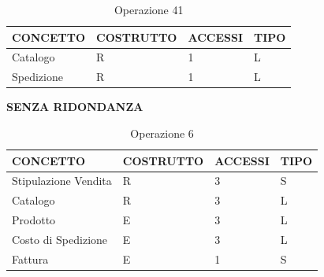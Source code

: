 \begin{table}[H]
\centering
\caption{Operazione 41}
\begin{tabular}{llll}
\\ \hline
\multicolumn{1}{|l|}{\textbf{CONCETTO}} & \multicolumn{1}{l|}{\textbf{COSTRUTTO}} & \multicolumn{1}{l|}{\textbf{ACCESSI}} & \multicolumn{1}{l|}{\textbf{TIPO}} \\ \hline
\multicolumn{1}{|l|}{Catalogo}
& \multicolumn{1}{l|}{R}                  & \multicolumn{1}{l|}{1}                & \multicolumn{1}{l|}{L}             \\ \hline
\multicolumn{1}{|l|}{Spedizione}
& \multicolumn{1}{l|}{R}                  & \multicolumn{1}{l|}{1}                & \multicolumn{1}{l|}{L}             \\ \hline
\end{tabular}
\end{table}


\centerline{\textbf{SENZA RIDONDANZA}}

\begin{table}[H]
\centering
\caption{Operazione 6}
\begin{tabular}{llll}
\\ \hline
\multicolumn{1}{|l|}{\textbf{CONCETTO}} & \multicolumn{1}{l|}{\textbf{COSTRUTTO}} & \multicolumn{1}{l|}{\textbf{ACCESSI}} & \multicolumn{1}{l|}{\textbf{TIPO}} \\ \hline
\multicolumn{1}{|l|}{Stipulazione Vendita}
& \multicolumn{1}{l|}{R}                  & \multicolumn{1}{l|}{3}                & \multicolumn{1}{l|}{S}             \\ \hline
\multicolumn{1}{|l|}{Catalogo}             & \multicolumn{1}{l|}{R}                  & \multicolumn{1}{l|}{3}        
& \multicolumn{1}{l|}{L}             
			 \\ \hline
\multicolumn{1}{|l|}{Prodotto}             & \multicolumn{1}{l|}{E}                  & \multicolumn{1}{l|}{3}        
& \multicolumn{1}{l|}{L}             
			 \\ \hline
\multicolumn{1}{|l|}{Costo di Spedizione}     & \multicolumn{1}{l|}{E}                  & \multicolumn{1}{l|}{3}      & \multicolumn{1}{l|}{L}             
			 \\ \hline
\multicolumn{1}{|l|}{Fattura}
& \multicolumn{1}{l|}{E}                  & \multicolumn{1}{l|}{1}                & \multicolumn{1}{l|}{S}             \\ \hline
\end{tabular}
\end{table}

